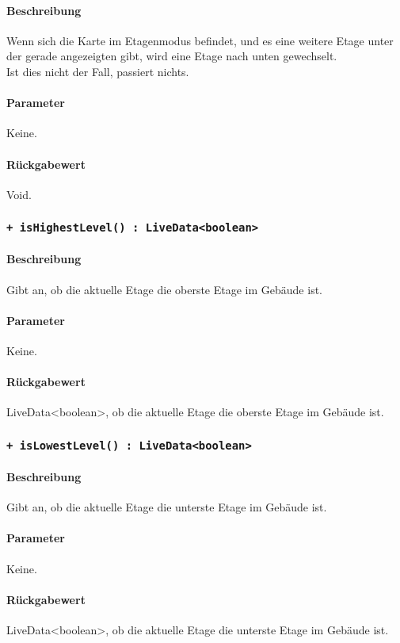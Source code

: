\paragraph*{Beschreibung}
Wenn sich die Karte im Etagenmodus befindet, und es eine weitere Etage unter der gerade 
angezeigten gibt, wird eine Etage nach unten gewechselt.\\
Ist dies nicht der Fall, passiert nichts.
\paragraph*{Parameter}
Keine.
\paragraph*{Rückgabewert}
Void.

\subsubsection*{\texttt{+ isHighestLevel() : LiveData<boolean>}}%
\paragraph*{Beschreibung}
Gibt an, ob die aktuelle Etage die oberste Etage im Gebäude ist.
\paragraph*{Parameter}
Keine.
\paragraph*{Rückgabewert}
LiveData<boolean>, ob die aktuelle Etage die oberste Etage im Gebäude ist.

\subsubsection*{\texttt{+ isLowestLevel() : LiveData<boolean>}}%
\paragraph*{Beschreibung}
Gibt an, ob die aktuelle Etage die unterste Etage im Gebäude ist.
\paragraph*{Parameter}
Keine.
\paragraph*{Rückgabewert}
LiveData<boolean>, ob die aktuelle Etage die unterste Etage im Gebäude ist.

